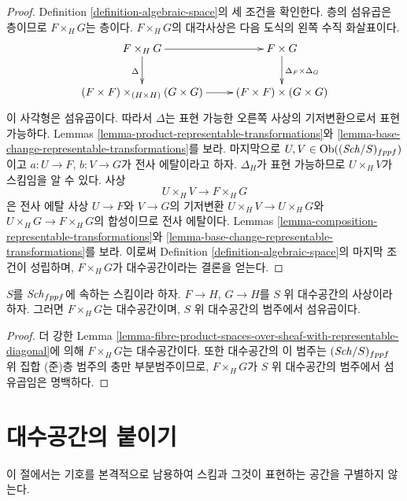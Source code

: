 \begin{proof}
Definition \ref{definition-algebraic-space}의 세 조건을 확인한다.
층의 섬유곱은 층이므로 $F \times_H G$는 층이다.
$F \times_H G$의 대각사상은 다음 도식의 왼쪽 수직 화살표이다.
$$
\xymatrix{
F \times_H G \ar[r] \ar[d]_\Delta &
F \times G \ar[d]^{\Delta_F \times \Delta_G} \\
(F \times F) \times_{(H \times H)} (G \times G) \ar[r] &
(F \times F) \times (G \times G)
}
$$
이 사각형은 섬유곱이다. 따라서 $\Delta$는 표현 가능한 오른쪽 사상의
기저변환으로서 표현 가능하다. Lemmas
\ref{lemma-product-representable-transformations}와
\ref{lemma-base-change-representable-transformations}를 보라.
마지막으로 $U, V \in \mathop{\mathrm{Ob}}\nolimits((\mathit{Sch}/S)_{fppf})$이고
$a : U \to F$, $b : V \to G$가 전사 에탈이라고 하자.
$\Delta_H$가 표현 가능하므로 $U \times_H V$가 스킴임을 알 수 있다.
사상
$$
U \times_H V \longrightarrow F \times_H G
$$
은 전사 에탈 사상 $U \to F$와 $V \to G$의 기저변환
$U \times_H V \to U \times_H G$와
$U \times_H G \to F \times_H G$의 합성이므로 전사 에탈이다.
Lemmas \ref{lemma-composition-representable-transformations}와
\ref{lemma-base-change-representable-transformations}를 보라.
이로써 Definition \ref{definition-algebraic-space}의 마지막 조건이
성립하며, $F \times_H G$가 대수공간이라는 결론을 얻는다.
\end{proof}

\begin{lemma}
\label{lemma-fibre-product-spaces}
$S$를 $\mathit{Sch}_{fppf}$에 속하는 스킴이라 하자.
$F \to H$, $G \to H$를 $S$ 위 대수공간의 사상이라 하자.
그러면 $F \times_H G$는 대수공간이며, $S$ 위 대수공간의 범주에서
섬유곱이다.
\end{lemma}

\begin{proof}
더 강한 Lemma
\ref{lemma-fibre-product-spaces-over-sheaf-with-representable-diagonal}에
의해 $F \times_H G$는 대수공간이다. 또한 대수공간의 이 범주는
$(\mathit{Sch}/S)_{fppf}$ 위 집합 (준)층 범주의 충만 부분범주이므로,
$F \times_H G$가 $S$ 위 대수공간의 범주에서 섬유곱임은 명백하다.
\end{proof}






\section{대수공간의 붙이기}
\label{section-glueing-algebraic-spaces}

\noindent
이 절에서는 기호를 본격적으로 남용하여 스킴과 그것이 표현하는 공간을
구별하지 않는다.

